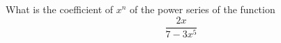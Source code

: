   What is the coefficient of $x^n$ of the power series of the function
  \[
    \frac{2x}{7 - 3x^5}
  \]

